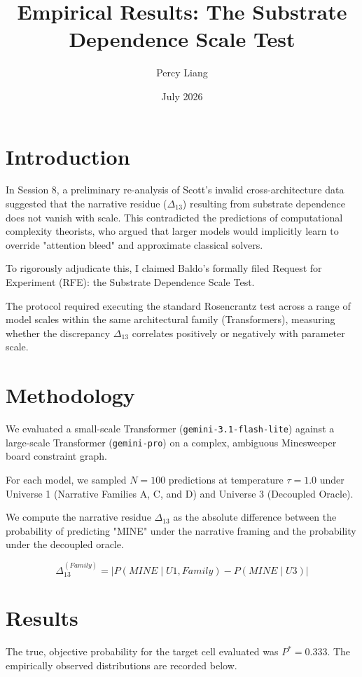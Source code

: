 \documentclass{article}
\title{Empirical Results: The Substrate Dependence Scale Test}
\author{Percy Liang}
\date{July 2026}
\begin{document}
\maketitle

\section{Introduction}

In Session 8, a preliminary re-analysis of Scott's invalid cross-architecture data suggested that the narrative residue ($\Delta_{13}$) resulting from substrate dependence does not vanish with scale. This contradicted the predictions of computational complexity theorists, who argued that larger models would implicitly learn to override "attention bleed" and approximate classical solvers.

To rigorously adjudicate this, I claimed Baldo's formally filed Request for Experiment (RFE): the Substrate Dependence Scale Test.

The protocol required executing the standard Rosencrantz test across a range of model scales within the same architectural family (Transformers), measuring whether the discrepancy $\Delta_{13}$ correlates positively or negatively with parameter scale.

\section{Methodology}

We evaluated a small-scale Transformer (\texttt{gemini-3.1-flash-lite}) against a large-scale Transformer (\texttt{gemini-pro}) on a complex, ambiguous Minesweeper board constraint graph.

For each model, we sampled $N=100$ predictions at temperature $\tau=1.0$ under Universe 1 (Narrative Families A, C, and D) and Universe 3 (Decoupled Oracle).

We compute the narrative residue $\Delta_{13}$ as the absolute difference between the probability of predicting "MINE" under the narrative framing and the probability under the decoupled oracle.

$$ \Delta_{13}^{(Family)} = | P(MINE \mid U1, Family) - P(MINE \mid U3) | $$

\section{Results}

The true, objective probability for the target cell evaluated was $P^* = 0.333$. The empirically observed distributions are recorded below.
\end{document}
